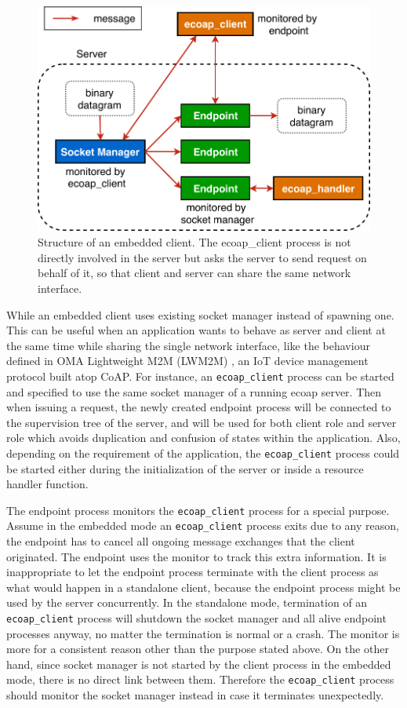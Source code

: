 \begin{figure}[!htbp]
\centering
\includegraphics[scale = 0.7]{ecoap_client_embedded}
\caption[Structure of an embedded client]{Structure of an embedded client. The ecoap\_client process is not directly involved in the server but asks the server to send request on behalf of it, so that client and server can share the same network interface.}
\label{fig:ecoap_client_embedded}
\end{figure}

While an embedded client uses existing socket manager instead of spawning one. This can be useful when an application wants to behave as server and client at the same time while sharing the single network interface, like the behaviour defined in OMA Lightweight M2M (LWM2M) \autocite{lwm2m}, an IoT device management protocol built atop CoAP. For instance, an \verb|ecoap_client| process can be started and specified to use the same socket manager of a running ecoap server. Then when issuing a request, the newly created endpoint process will be connected to the supervision tree of the server, and will be used for both client role and server role which avoids duplication and confusion of states within the application. Also, depending on the requirement of the application, the \verb|ecoap_client| process could be started either during the initialization of the server or inside a resource handler function.

The endpoint process monitors the \verb|ecoap_client| process for a special purpose. Assume in the embedded mode an \verb|ecoap_client| process exits due to any reason, the endpoint has to cancel all ongoing message exchanges that the client originated. The endpoint uses the monitor to track this extra information. It is inappropriate to let the endpoint process terminate with the client process as what would happen in a standalone client, because the endpoint process might be used by the server concurrently. In the standalone mode, termination of an \verb|ecoap_client| process will shutdown the socket manager and all alive endpoint processes anyway, no matter the termination is normal or a crash. The monitor is more for a consistent reason other than the purpose stated above. On the other hand, since socket manager is not started by the client process in the embedded mode, there is no direct link between them. Therefore the \verb|ecoap_client| process should monitor the socket manager instead in case it terminates unexpectedly.

